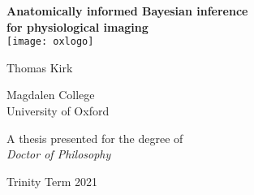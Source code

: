 \documentclass[12pt]{report}
\begin{document}
\begin{titlepage}
   \begin{center}

       \textbf{\LARGE Anatomically informed Bayesian inference\\for physiological imaging\\}
       \vspace{2cm}
       \texttt{[image: oxlogo]}

		\vfill
       {\Large Thomas Kirk}
        \vspace{0.4cm}

       {\large Magdalen College\\}
       {\large University of Oxford\\}

       \vfill
            
       A thesis presented for the degree of\\
       \textit{Doctor of Philosophy}\\
       \vspace{0.8cm}

       Trinity Term 2021
            
   \end{center}
\end{titlepage}


\tableofcontents


\newpage
\pagestyle{fancy}
\fancyhf{}
\setlength{\headheight}{14.49998pt}
\fancyhead[OL]{\itshape\nouppercase{\leftmark}}
\fancyhead[OR]{\thepage}
\doublespacing









\singlespacing



\end{document}
